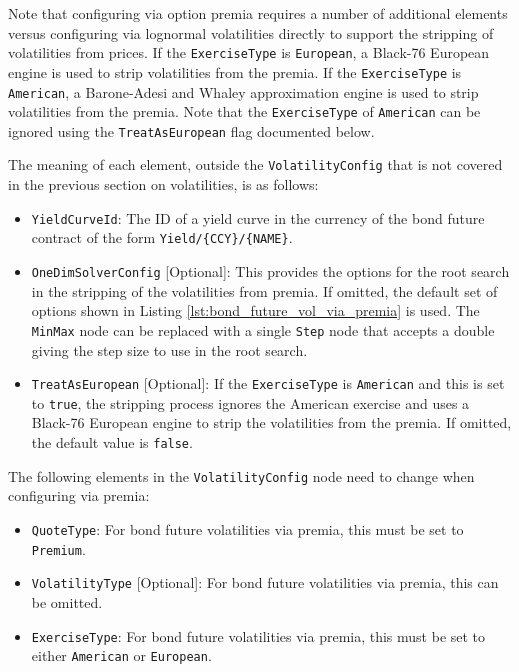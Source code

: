Note that configuring via option premia requires a number of additional elements versus configuring via lognormal 
volatilities directly to support the stripping of volatilities from prices.
If the \lstinline!ExerciseType! is \lstinline!European!, a Black-76 European engine is used to strip volatilities 
from the premia. If the \lstinline!ExerciseType! is \lstinline!American!, a Barone-Adesi and Whaley approximation 
engine is used to strip volatilities from the premia. Note that the \lstinline!ExerciseType! of \lstinline!American! 
can be ignored using the \lstinline!TreatAsEuropean! flag documented below.

The meaning of each element, outside the \lstinline!VolatilityConfig! that is not covered in the previous 
section on volatilities, is as follows:

\begin{itemize}

\item \lstinline!YieldCurveId!:
  The ID of a yield curve in the currency of the bond future contract of the form \lstinline!Yield/{CCY}/{NAME}!.

\item \lstinline!OneDimSolverConfig! [Optional]:
  This provides the options for the root search in the stripping of the volatilities from premia.
  If omitted, the default set of options shown in Listing \ref{lst:bond_future_vol_via_premia} is used.
  The \lstinline!MinMax! node can be replaced with a single \lstinline!Step! node that accepts a double giving the 
  step size to use in the root search.

\item \lstinline!TreatAsEuropean! [Optional]:
  If the \lstinline!ExerciseType! is \lstinline!American! and this is set to \lstinline!true!, the stripping process 
  ignores the American exercise and uses a Black-76 European engine to strip the volatilities from the premia.
  If omitted, the default value is \lstinline!false!.

\end{itemize}

The following elements in the \lstinline!VolatilityConfig! node need to change when configuring via premia:
\begin{itemize}

\item \lstinline!QuoteType!:
  For bond future volatilities via premia, this must be set to \lstinline!Premium!.

\item \lstinline!VolatilityType! [Optional]:
  For bond future volatilities via premia, this can be omitted.

\item \lstinline!ExerciseType!:
  For bond future volatilities via premia, this must be set to either \lstinline!American! or \lstinline!European!.

\end{itemize}

